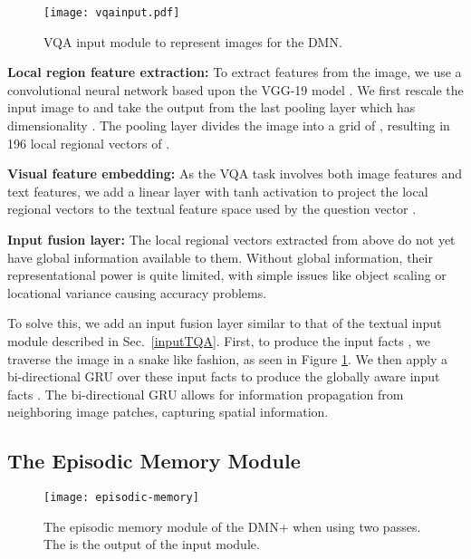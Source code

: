 \documentclass{article}
\begin{document}
\begin{figure}
   \centering
   	 	\texttt{[image: vqainput.pdf]}
   	 	\vspace{-0.4cm}
   \caption{VQA input module to represent images for the DMN.}\label{fig:result}
   \label{fig:vqa}
\end{figure}


\textbf{Local region feature extraction:} 
To extract features from the image, we use a convolutional neural network \cite{Krizhevsky2012} based upon the VGG-19 model \cite{simonyan2014very}.
We first rescale the input image to  and take the output from the last pooling layer which has dimensionality .
The pooling layer divides the image into a grid of , resulting in 196 local regional vectors of .

\textbf{Visual feature embedding:} 
As the VQA task involves both image features and text features, we add a linear layer with tanh activation to project the local regional vectors to the textual feature space used by the question vector .

\textbf{Input fusion layer:} 
The local regional vectors extracted from above do not yet have global information available to them.
Without global information, their representational power is quite limited, with simple issues like object scaling or locational variance causing accuracy problems.

To solve this, we add an input fusion layer similar to that of the textual input module described in Sec.~\ref{inputTQA}.
First, to produce the input facts , we traverse the image in a snake like fashion, as seen in Figure \ref{fig:vqa}.
We then apply a bi-directional GRU over these input facts  to produce the globally aware input facts .
The bi-directional GRU allows for information propagation from neighboring image patches, capturing spatial information.






\subsection{The Episodic Memory Module}
\begin{figure}
\centering
\texttt{[image: episodic-memory]}
\vspace{-0.3cm}
\caption{The episodic memory module of the DMN+ when using two passes. The  is the output of the input module.
\label{fig:episodicModule}
}
\end{figure}
\end{document}
